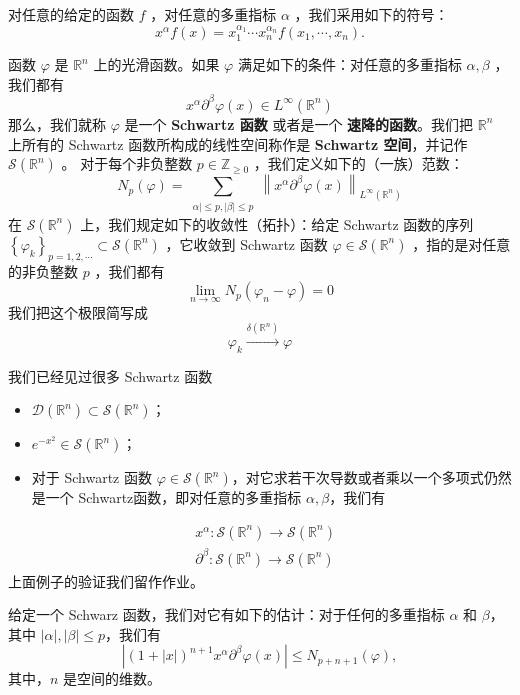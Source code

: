 对任意的给定的函数 $f$ ，对任意的多重指标 $\alpha$ ，我们采用如下的符号：
\[
x^\alpha f(x)=x_1^{\alpha_1} \cdots x_n^{\alpha_n} f\left(x_1, \cdots, x_n\right) .
\]
\begin{definition}
函数 $\varphi$ 是 $\mathbb{R}^n$ 上的光滑函数。如果 $\varphi$ 满足如下的条件：对任意的多重指标 $\alpha, \beta$ ，我们都有
\[
x^\alpha \partial^\beta \varphi(x) \in L^{\infty}\left(\mathbb{R}^n\right)
\]那么，我们就称 $\varphi$ 是一个 \textbf{Schwartz 函数} 或者是一个 \textbf{速降的函数}。我们把 $\mathbb{R}^n$ 上所有的 Schwartz 函数所构成的线性空间称作是 \textbf{Schwartz 空间}，并记作 $\mathcal{S}\left(\mathbb{R}^n\right)$ 。
对于每个非负整数 $p \in \mathbb{Z}_{\geqslant 0}$ ，我们定义如下的（一族）范数：
\[
N_p(\varphi)=\sum_{\substack{\alpha|\leqslant p,|\beta| \leqslant p}}\left\|x^\alpha \partial^\beta \varphi(x)\right\|_{L^{\infty}\left(\mathbb{R}^n\right)}
\]在 $\mathcal{S}\left(\mathbb{R}^n\right)$ 上，我们规定如下的收敛性（拓扑）：给定 Schwartz 函数的序列 $\left\{\varphi_k\right\}_{p=1,2, \cdots} \subset \mathcal{S}\left(\mathbb{R}^n\right)$ ，它收敛到 Schwartz 函数 $\varphi \in \mathcal{S}\left(\mathbb{R}^n\right)$ ，指的是对任意的非负整数 $p$ ，我们都有
\[
\lim _{n \rightarrow \infty} N_p\left(\varphi_n-\varphi\right)=0
\]我们把这个极限简写成
\[
\varphi_k \xrightarrow{\delta\left(\mathbb{R}^n\right)} \varphi
\]
\end{definition}
\begin{example}
我们已经见过很多 Schwartz 函数
	\begin{itemize}
		\item $\mathcal{D}\left(\mathbb{R}^n\right) \subset \mathcal{S}\left(\mathbb{R}^n\right)$；
		\item $e^{-x^2} \in \mathcal{S}\left(\mathbb{R}^n\right)$；
		\item 对于 Schwartz 函数 $\varphi \in \mathcal{S}\left(\mathbb{R}^n\right)$，对它求若干次导数或者乘以一个多项式仍然是一个 Schwartz函数，即对任意的多重指标 $\alpha, \beta$，我们有
	\end{itemize}
\[
\begin{aligned}
& x^\alpha: \mathcal{S}\left(\mathbb{R}^n\right) \rightarrow \mathcal{S}\left(\mathbb{R}^n\right) \\
& \partial^\beta: \mathcal{S}\left(\mathbb{R}^n\right) \rightarrow \mathcal{S}\left(\mathbb{R}^n\right)
\end{aligned}
\]上面例子的验证我们留作作业。
\end{example}
给定一个 Schwarz 函数，我们对它有如下的估计：对于任何的多重指标 $\alpha$ 和 $\beta$，其中 $|\alpha|,|\beta| \leqslant p$，我们有
\[
\left|(1+|x|)^{n+1} x^\alpha \partial^\beta \varphi(x)\right| \leqslant N_{p+n+1}(\varphi),
\]
其中，$n$ 是空间的维数。

